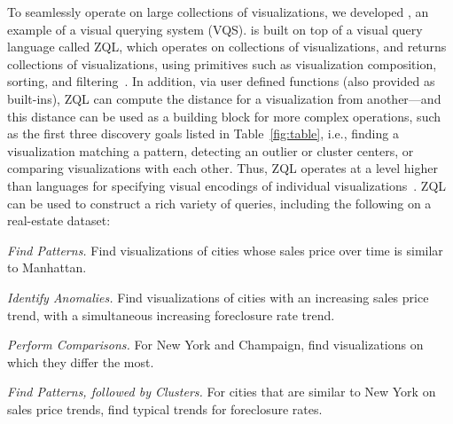 \par To seamlessly operate on large collections of visualizations,
we developed \zv, an example of a visual querying system (VQS).
\zv is built on top of a visual query language
called ZQL, which operates on collections of visualizations, and returns
collections of visualizations,
using primitives such as visualization composition,
sorting, and filtering~\cite{Siddiqui2016}. 
In addition, via user defined functions (also provided as built-ins),
ZQL can compute the distance for a visualization from another---and this
distance can be used as a building block for more complex
operations, such as the first three discovery goals listed
in Table~\ref{fig:table}, i.e., finding a visualization
matching a pattern, detecting an outlier or cluster centers,
or comparing visualizations with each other.
Thus, ZQL operates at a level higher than
languages for specifying visual encodings of
individual visualizations~\cite{Stolte2002,Wilkinson2005}.
ZQL can be used to construct a rich variety of queries,
including the following on a real-estate dataset:
\squishlist
	\item {\em Find Patterns.} Find visualizations of cities whose sales price over time is similar to Manhattan. 
	\item {\em Identify Anomalies.} Find visualizations of cities with an increasing sales price trend, with a simultaneous increasing foreclosure rate trend.
	\item {\em Perform Comparisons.} For New York and Champaign, find visualizations on which they differ the most.
	\item {\em Find Patterns, followed by Clusters.} For cities that are similar
	to New York on sales price trends, find typical trends for foreclosure rates.
\squishend

\par {}


